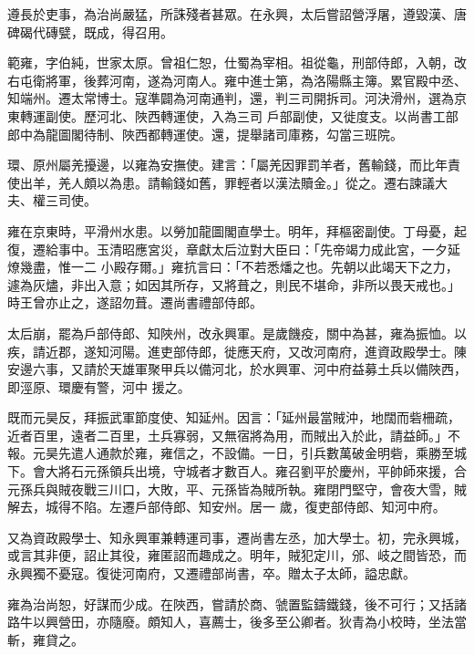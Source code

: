 \begin{pinyinscope}
 遵長於吏事，為治尚嚴猛，所誅殘者甚眾。在永興，太后嘗詔營浮屠，遵毀漢、唐碑碣代磚甓，既成，得召用。



 範雍，字伯純，世家太原。曾祖仁恕，仕蜀為宰相。祖從龜，刑部侍郎，入朝，改右屯衛將軍，後葬河南，遂為河南人。雍中進士第，為洛陽縣主簿。累官殿中丞、知端州。遷太常博士。寇準闢為河南通判，還，判三司開拆司。河決滑州，選為京東轉運副使。歷河北、陜西轉運使，入為三司
 戶部副使，又徙度支。以尚書工部郎中為龍圖閣待制、陜西都轉運使。還，提舉諸司庫務，勾當三班院。



 環、原州屬羌擾邊，以雍為安撫使。建言：「屬羌因罪罰羊者，舊輸錢，而比年責使出羊，羌人頗以為患。請輸錢如舊，罪輕者以漢法贖金。」從之。遷右諫議大夫、權三司使。



 雍在京東時，平滑州水患。以勞加龍圖閣直學士。明年，拜樞密副使。丁母憂，起復，遷給事中。玉清昭應宮災，章獻太后泣對大臣曰：「先帝竭力成此宮，一夕延燎幾盡，惟一二
 小殿存爾。」雍抗言曰：「不若悉燔之也。先朝以此竭天下之力，遽為灰燼，非出入意；如因其所存，又將葺之，則民不堪命，非所以畏天戒也。」時王曾亦止之，遂詔勿葺。遷尚書禮部侍郎。



 太后崩，罷為戶部侍郎、知陜州，改永興軍。是歲饑疫，關中為甚，雍為振恤。以疾，請近郡，遂知河陽。進吏部侍郎，徙應天府，又改河南府，進資政殿學士。陳安邊六事，又請於天雄軍聚甲兵以備河北，於水興軍、河中府益募土兵以備陜西，即涇原、環慶有警，河中
 援之。



 既而元昊反，拜振武軍節度使、知延州。因言：「延州最當賊沖，地闊而砦柵疏，近者百里，遠者二百里，土兵寡弱，又無宿將為用，而賊出入於此，請益師。」不報。元昊先遣人通款於雍，雍信之，不設備。一日，引兵數萬破金明砦，乘勝至城下。會大將石元孫領兵出境，守城者才數百人。雍召劉平於慶州，平帥師來援，合元孫兵與賊夜戰三川口，大敗，平、元孫皆為賊所執。雍閉門堅守，會夜大雪，賊解去，城得不陷。左遷戶部侍郎、知安州。居一
 歲，復吏部侍郎、知河中府。



 又為資政殿學士、知永興軍兼轉運司事，遷尚書左丞，加大學士。初，完永興城，或言其非便，詔止其役，雍匿詔而趣成之。明年，賊犯定川，邠、岐之間皆恐，而永興獨不憂寇。復徙河南府，又遷禮部尚書，卒。贈太子太師，謚忠獻。



 雍為治尚恕，好謀而少成。在陜西，嘗請於商、虢置監鑄鐵錢，後不可行；又括諸路牛以興營田，亦隨廢。頗知人，喜薦士，後多至公卿者。狄青為小校時，坐法當斬，雍貸之。




\end{pinyinscope}
